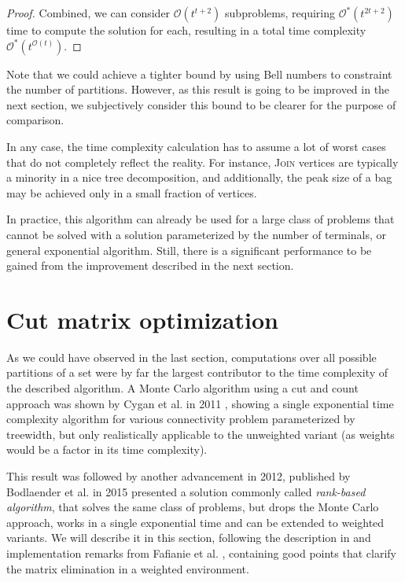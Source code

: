 \documentclass[thesis=M,english,hidelinks]{FITthesis}[2012/10/20]
\theoremstyle{definition}
\begin{document}
\begin{proof}
    Combined, we can consider $\mathcal{O}(t^{t+2})$ subproblems, requiring $\mathcal{O}^*(t^{2t + 2})$ time to
    compute the solution for each, resulting in a total time complexity $\mathcal{O}^*(t^{\mathcal{O}(t)})$.
\end{proof}


Note that we could achieve a tighter bound by using Bell numbers to constraint the number of partitions. However, as
this result is going to be improved in the next section, we subjectively consider this bound to be clearer for the
purpose of comparison.

In any case, the time complexity calculation has to assume a lot of worst cases that do not completely reflect the
reality. For instance, \textsc{Join} vertices are typically a minority in a nice tree decomposition, and additionally,
the peak size of a bag may be achieved only in a small fraction of vertices.

In practice, this algorithm can already be used for a large class of problems that cannot be solved with a solution
parameterized by the number of terminals, or general exponential algorithm. Still, there is a significant performance to
be gained from the improvement described in the next section.

\section{Cut matrix optimization}
\label{sec:cutmatrix}

As we could have observed in the last section, computations over all possible partitions of a set were by far the
largest contributor to the time complexity of the described algorithm. A Monte Carlo algorithm using a cut and count
approach was shown by Cygan et al. in 2011 \cite{Cygan2011}, showing a single exponential time complexity algorithm for
various connectivity problem parameterized by treewidth, but only realistically applicable to the unweighted variant
(as weights would be a factor in its time complexity).

This result was followed by another advancement in 2012, published by Bodlaender et al. in 2015 \cite{Bodlaender2012}
presented a solution commonly called \emph{rank-based algorithm}, that solves the same class of problems, but drops the
Monte Carlo approach, works in a single exponential time and can be extended to weighted variants. We will describe it
in this section, following the description in \cite[p.  365--371]{Cygan2015} and implementation remarks from Fafianie et
al.  \cite{Fafianie2013}, containing good points that clarify the matrix elimination in a weighted environment.
\end{document}
